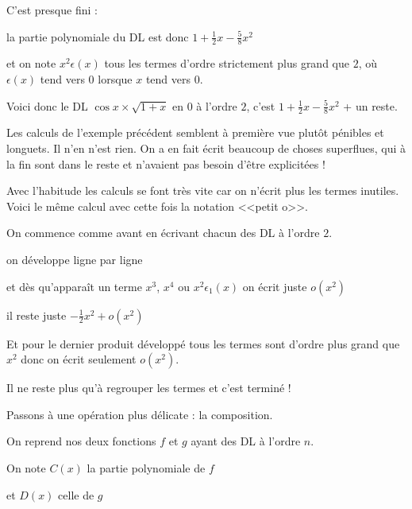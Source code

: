 \change

C'est presque fini :

la partie polynomiale du DL est donc $1+\frac{1}{2}x-\frac{5}{8}x^2$

\change

et on note $x^2\epsilon(x)$ tous les termes d'ordre strictement plus grand que $2$,
où $\epsilon(x)$ tend vers $0$ lorsque $x$ tend vers $0$.

Voici donc le DL $\cos x \times \sqrt{1+x}$ en $0$  à l'ordre $2$,
c'est $1+\frac{1}{2}x-\frac{5}{8}x^2$ + un reste.

\diapo

Les calculs de l'exemple précédent semblent à première vue plutôt pénibles et longuets.
Il n'en n'est rien. On a en fait écrit beaucoup de choses superflues, 
qui à la fin sont dans le reste et n'avaient pas besoin d'être explicitées !


Avec l'habitude les calculs se font très vite car on n'écrit plus les termes inutiles. 
Voici le même calcul avec cette fois la notation <<petit o>>.


\change

On commence comme avant en écrivant chacun des DL à l'ordre $2$.

\change

on développe ligne par ligne

\change

et dès qu'apparaît un terme $x^3$, $x^4$ ou $x^2\epsilon_1(x)$ on écrit juste $o(x^2)$

il reste juste $-\frac{1}{2}x^2 + o(x^2)$

\change
 Et pour le dernier produit développé tous les termes sont d'ordre plus grand que $x^2$
donc on écrit seulement $o(x^2)$.

\change

Il ne reste plus qu'à regrouper les termes et c'est terminé !



\diapo

Passons à une opération plus délicate : la composition.

On reprend nos deux fonctions $f$ et $g$ ayant des DL à l'ordre $n$.

\change

On note $C(x)$ la partie polynomiale de $f$ 

\change 

et $D(x)$ celle de $g$ 

